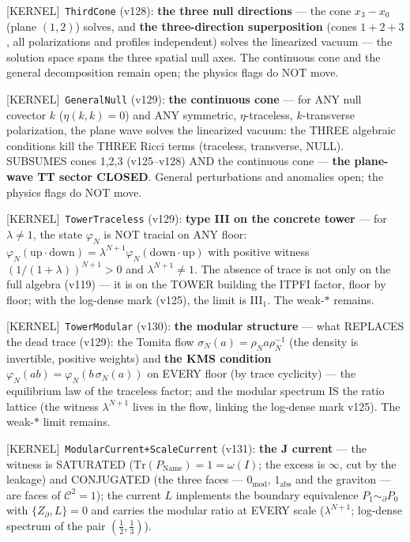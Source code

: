 \documentclass[11pt]{article}
\providecommand{\kernelmk}[1]{\textsf{[KERNEL]}~\texttt{#1}}\providecommand{\knownmk}[1]{\textsf{[KNOWN]}~{#1}}\providecommand{\statusmk}[1]{\textsf{[#1]}}
\theoremstyle{definition}\newtheorem{deriv}{Derivation}
\begin{document}
\kernelmk{ThirdCone} (v128): \textbf{the three null directions} --- the cone $x_3{-}x_0$ (plane $(1,2)$) solves, and \textbf{the three-direction superposition} (cones $1{+}2{+}3$, all polarizations and profiles independent) solves the linearized vacuum --- the solution space spans the three spatial null axes. The continuous cone and the general decomposition remain open; the physics flags do NOT move.

\kernelmk{GeneralNull} (v129): \textbf{the continuous cone} --- for ANY null covector $k$ ($\eta(k,k)=0$) and ANY symmetric, $\eta$-traceless, $k$-transverse polarization, the plane wave solves the linearized vacuum: the THREE algebraic conditions kill the THREE Ricci terms (traceless, transverse, NULL). SUBSUMES cones 1,2,3 (v125--v128) AND the continuous cone --- \textbf{the plane-wave TT sector CLOSED}. General perturbations and anomalies open; the physics flags do NOT move.

\kernelmk{TowerTraceless} (v129): \textbf{type III on the concrete tower} --- for $\lambda\neq1$, the state $\varphi_N$ is NOT tracial on ANY floor: $\varphi_N(\text{up}\cdot\text{down})=\lambda^{N+1}\varphi_N(\text{down}\cdot\text{up})$ with positive witness $(1/(1{+}\lambda))^{N+1}>0$ and $\lambda^{N+1}\neq1$. The absence of trace is not only on the full algebra (v119) --- it is on the TOWER building the ITPFI factor, floor by floor; with the log-dense mark (v125), the limit is III$_1$. The weak-$*$ remains.

\kernelmk{TowerModular} (v130): \textbf{the modular structure} --- what REPLACES the dead trace (v129): the Tomita flow $\sigma_N(a)=\rho_N a\rho_N^{-1}$ (the density is invertible, positive weights) and \textbf{the KMS condition} $\varphi_N(ab)=\varphi_N(b\,\sigma_N(a))$ on EVERY floor (by trace cyclicity) --- the equilibrium law of the traceless factor; and the modular spectrum IS the ratio lattice (the witness $\lambda^{N+1}$ lives in the flow, linking the log-dense mark v125). The weak-$*$ limit remains.

\kernelmk{ModularCurrent+\allowbreak ScaleCurrent} (v131): \textbf{the J current} --- the witness is SATURATED ($\mathrm{Tr}(P_{\mathrm{Name}})=1=\omega(I)$; the excess is $\infty$, cut by the leakage) and CONJUGATED (the three faces --- $0_{\mathrm{mod}}$, $1_{\mathrm{abs}}$ and the graviton --- are faces of $\mathcal{C}^2=1$); the current $L$ implements the boundary equivalence $P_1\sim_\partial P_0$ with $\{Z_\partial,L\}=0$ and carries the modular ratio at EVERY scale ($\lambda^{N+1}$; log-dense spectrum of the pair $(\tfrac12,\tfrac13)$).
\end{document}

